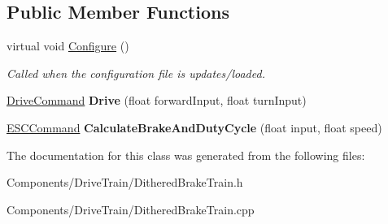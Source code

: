 \subsection*{\-Public \-Member \-Functions}
\begin{DoxyCompactItemize}
\item 
\hypertarget{class_dithered_brake_train_a84de34851821ba3a11c01bcb4670273d}{
virtual void \hyperlink{class_dithered_brake_train_a84de34851821ba3a11c01bcb4670273d}{\-Configure} ()}
\label{class_dithered_brake_train_a84de34851821ba3a11c01bcb4670273d}

\begin{DoxyCompactList}\small\item\em \-Called when the configuration file is updates/loaded. \end{DoxyCompactList}\item 
\hypertarget{class_dithered_brake_train_a4a67b208158acac7c5771ca8bc2e06a2}{
\hyperlink{struct_drive_command}{\-Drive\-Command} {\bfseries \-Drive} (float forward\-Input, float turn\-Input)}
\label{class_dithered_brake_train_a4a67b208158acac7c5771ca8bc2e06a2}

\item 
\hypertarget{class_dithered_brake_train_a90b5316ec6404a12b695085ab65f20ef}{
\hyperlink{struct_e_s_c_command}{\-E\-S\-C\-Command} {\bfseries \-Calculate\-Brake\-And\-Duty\-Cycle} (float input, float speed)}
\label{class_dithered_brake_train_a90b5316ec6404a12b695085ab65f20ef}

\end{DoxyCompactItemize}


\-The documentation for this class was generated from the following files\-:\begin{DoxyCompactItemize}
\item 
\-Components/\-Drive\-Train/\-Dithered\-Brake\-Train.\-h\item 
\-Components/\-Drive\-Train/\-Dithered\-Brake\-Train.\-cpp\end{DoxyCompactItemize}
